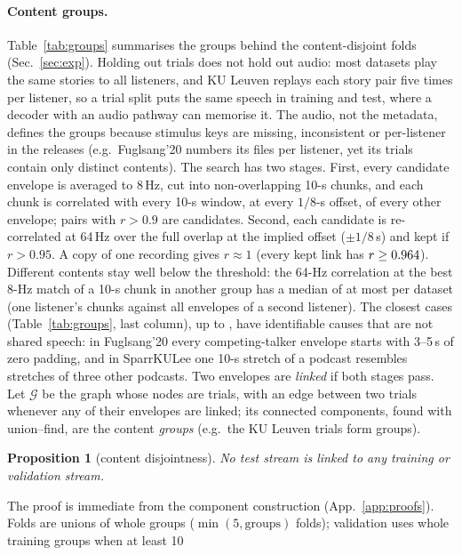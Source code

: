 \documentclass[twoside]{article}
\newtheorem{proposition}{Proposition}
\begin{document}
\paragraph{Content groups.} Table~\ref{tab:groups} summarises the groups behind the
content-disjoint folds (Sec.~\ref{sec:exp}). Holding out trials does not hold out audio: most
datasets play the same stories to all listeners, and KU Leuven replays each story pair five
times per listener, so a trial split puts the same speech in training and test, where a
decoder with an audio pathway can memorise it. The audio, not the metadata, defines the groups
because stimulus keys are missing, inconsistent or per-listener in the releases (e.g.\
Fuglsang'20 numbers its files per listener, yet its \grpFugTrials{} trials contain only
\grpFugGroups{} distinct contents). The search has two stages. First, every candidate
envelope is averaged to 8\,Hz, cut into non-overlapping 10-s chunks, and each chunk is
correlated with every 10-s window, at every $1/8$-s offset, of every other envelope; pairs
with $r>0.9$ are candidates. Second, each candidate is re-correlated at 64\,Hz over the full
overlap at the implied offset ($\pm1/8$\,s) and kept if $r>0.95$. A copy of one recording
gives $r\approx1$ (every kept link has $r\ge0.964$). Different contents stay well below the
threshold: the 64-Hz correlation at the best 8-Hz match of a 10-s chunk in another group has
a median of at most \grpNullMed{} per dataset (one listener's chunks against all envelopes of a second
listener). The closest cases (Table~\ref{tab:groups}, last column), up to \grpNullMax, have
identifiable causes that are not shared speech: in Fuglsang'20 every competing-talker envelope
starts with 3--5\,s of zero padding, and in SparrKULee one 10-s stretch of a podcast
resembles stretches of three other podcasts. Two envelopes are \emph{linked} if both stages pass. Let $\mathcal G$ be the graph whose
nodes are trials, with an edge between two trials whenever any of their envelopes are
linked; its connected components, found with union--find, are the content \emph{groups}
(e.g.\ the \grpKULTrials{} KU Leuven trials form \grpKULGroups{} groups).
\begin{proposition}[content disjointness]\label{prop:split}
No test stream is linked to any training or validation stream.
\end{proposition}
The proof is immediate from the component construction (App.~\ref{app:proofs}). Folds are unions of whole groups
($\min(5,\text{groups})$ folds); validation uses whole training groups when at least 10
\end{document}
